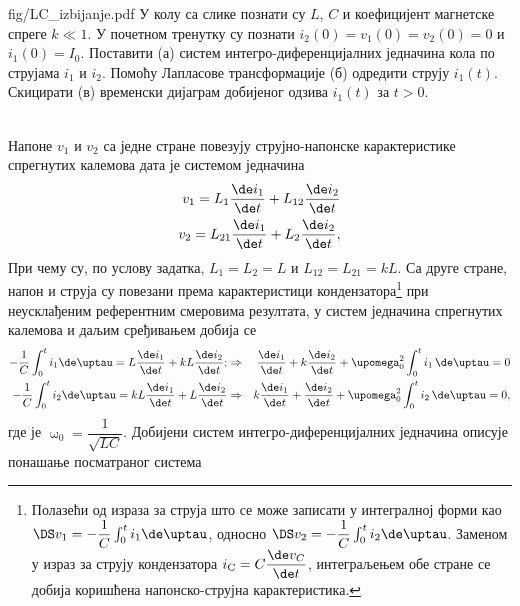 \mnDifficult
\begin{slikaDesno}[0.833]{fig/LC_izbijanje.pdf}
    \PID \label{z:LC_izbijanje}
     У колу са слике познати су 
    $L$, 
    $C$ и коефицијент магнетске спреге $k \ll 1$.
    У почетном тренутку су познати 
    $i_2(0) = v_1(0) = v_2(0) = 0$ и 
    $i_1(0) = I_0$. Поставити (а)
    систем 
    интегро-диференцијалних једначина кола 
    по струјама $i_1$ и $i_2$. Помоћу 
    Лапласове
    трансформације (б) одредити струју $i_1(t)$.
    Скицирати (в) временски дијаграм 
    добијеног одзива
    $i_1(t)$ за $t > 0$.
\end{slikaDesno} \\

\RESENJE 
Напоне $v_1$ и $v_2$ са једне стране повезују струјно-напонске карактеристике
спрегнутих калемова дата је системом једначина 
\begin{eqnarray}
    v_1 = L_1 \dfrac{\de i_1}{\de t} + L_{12} \dfrac{\de i_2}{\de t} \\
    v_2 = L_{21} \dfrac{\de i_1}{\de t} + L_{2} \dfrac{\de i_2}{\de t},
\end{eqnarray}
При чему су, по услову задатка, $L_1 = L_2 = L$ и $L_{12} = L_{21} = kL$. Са друге стране, 
напон и струја су повезани према карактеристици кондензатора\footnote{
Полазећи од израза за струја што се може записати у интегралној форми као 
$\DS v_{\rm 1} = - \dfrac{1}{C} \int_{0}^{t} i_1 \de \uptau$, односно
$\DS v_{\rm 2} = - \dfrac{1}{C} \int_{0}^{t} i_2 \de \uptau$.
Заменом у израз за струју кондензатора $i_{\rm C} = C \dfrac{\de v_C}{\de t}$, интеграљењем
обе стране се добија коришћена напонско-струјна карактеристика.
} при неусклађеним референтним 
смеровима резултата, у систем једначина спрегнутих калемова и даљим сређивањем добија се 
\begin{eqnarray}
    - \dfrac{1}{C} \int_{0}^{t} i_1 \de \uptau = L \dfrac{\de i_1}{\de t} + kL \dfrac{\de i_2}{\de t}; 
    & \Rightarrow & 
    \dfrac{\de i_1}{\de t} + k \dfrac{\de i_2}{\de t} + \upomega_0^2 \int_0^t i_1 \, \de \uptau = 0
    \\
    - \dfrac{1}{C} \int_{0}^{t} i_2 \de \uptau = kL \dfrac{\de i_1}{\de t} + L \dfrac{\de i_2}{\de t}
    & \Rightarrow &
    k \dfrac{\de i_1}{\de t} + \dfrac{\de i_2}{\de t} + \upomega_0^2 \int_0^t i_2 \, \de \uptau = 0,
\end{eqnarray}
где је $\upomega_0 = \dfrac{1}{\sqrt{LC}}$. Добијени систем интегро-диференцијалних једначина 
описује понашање посматраног система \\

